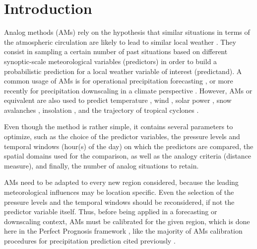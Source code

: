 \documentclass{ametsoc}
\begin{document}


\section{Introduction}
\label{sec:intro}

Analog methods (AMs) rely on the hypothesis that similar situations in terms of the atmospheric circulation are likely to lead to similar local weather \citep{Lorenz1956, Lorenz1969, Duband1970, Bontron2005}. They consist in sampling a certain number of past situations based on different synoptic-scale meteorological variables (predictors) in order to build a probabilistic prediction for a local weather variable of interest (predictand). A common usage of AMs is for operational precipitation forecasting \citep[eg.][]{Guilbaud1997, Bontron2005, Hamill2006, Bliefernicht2010, Marty2012, Horton2012, Hamill2015b, BenDaoud2016}, or more recently for precipitation downscaling in a climate perspective \citep[eg.][]{Radanovics2013, Chardon2014, Dayon2015}. However, AMs or equivalent are also used to predict temperature \citep{Radinovic1975, Woodcock1980, Kruizinga1983, DelleMonache2013, Caillouet2016}, wind \citep{Gordon1987, DelleMonache2013, DelleMonache2011, Vanvyve2015, Alessandrini2015, Junk2015, Junk2015c}, solar power \citep{Alessandrini2015a, Bessa2015}, snow avalanches \citep{Obled1980, Bolognesi1993}, insolation \citep{Bois1981}, and the trajectory of tropical cyclones \citep{Keenan1981, Sievers2000, Fraedrich2003}.

Even though the method is rather simple, it contains several parameters to optimize, such as the choice of the predictor variables, the pressure levels and temporal windows (hour(s) of the day) on which the predictors are compared, the spatial domains used for the comparison, as well as the analogy criteria (distance measure), and finally, the number of analog situations to retain. 

AMs need to be adapted to every new region considered, because the leading meteorological influences may be location specific. Even the selection of the pressure levels and the temporal windows should be reconsidered, if not the predictor variable itself. Thus, before being applied in a forecasting or downscaling context, AMs must be calibrated for the given region, which is done here in the Perfect Prognosis framework \citep{Klein1963}, like the majority of AMs calibration procedures for precipitation prediction cited previously \cite[with the exception of][]{Hamill2006,Hamill2015b}.
\end{document}
